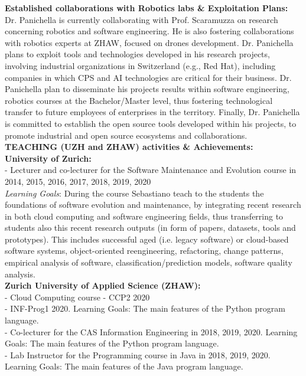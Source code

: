 \documentclass[12pt]{article}
\begin{document}
\textbf{Established collaborations with Robotics labs \& Exploitation Plans:}\\
 Dr. Panichella is currently collaborating with Prof. Scaramuzza on research concerning robotics and software engineering. He is also fostering collaborations with robotics experts at ZHAW, focused on drones development.
 Dr. Panichella plans to exploit tools and technologies developed in his research projects, involving industrial organizations in Switzerland (e.g., Red Hat), including companies
in which CPS and AI technologies are critical for their business. 
Dr. Panichella plan to disseminate his projects results within software engineering, robotics courses at the Bachelor/Master level, thus fostering
technological transfer to future employees of enterprises in the territory. Finally, Dr. Panichella is committed to establish the open source tools developed within his projects, to promote industrial and open source ecosystems and collaborations.\\

\textbf{TEACHING (UZH and ZHAW) activities \& Achievements:}\\
\textbf{University of Zurich:} \\
-   Lecturer and co-lecturer for the Software Maintenance and Evolution course in 2014, 2015, 2016, 2017, 2018, 2019, 2020\\   \textit{Learning Goals}: During the course Sebastiano teach to
the students the foundations of software evolution and maintenance, by integrating recent research in both cloud computing and
software engineering fields, thus transferring to students also this recent research outputs (in form of papers, datasets, tools and
prototypes). This includes successful aged (i.e. legacy software) or cloud-based software systems, object-oriented reengineering,
refactoring, change patterns, empirical analysis of software, classification/prediction models, software quality analysis.\\
\textbf{Zurich University of Applied Science (ZHAW):}\\
- Cloud Computing course - CCP2 2020\\
- INF-Prog1 2020. Learning Goals: The main features of the Python program language.\\
- Co-lecturer for the CAS Information Engineering in 2018, 2019, 2020.
Learning Goals: The main features of the Python program language.\\
- Lab Instructor for the Programming course in Java in 2018, 2019, 2020.
Learning Goals: The main features of the Java program language.\\
\end{document}
